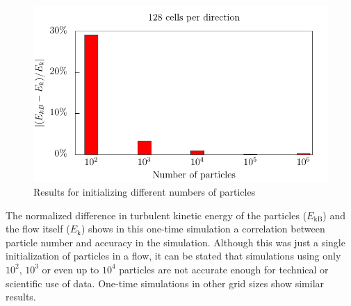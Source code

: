 \documentclass[11pt,a4paper,openany,oneside,parskip=half*]{article}
\begin{document}
\begin{figure}[h]
	\centering
  \includegraphics[width=\textwidth]{./../Simulationsergebnisse/variationPartikelAnzahl/128/kineticEnergy_numberOfParticles.pdf}
	\caption{Results for initializing different numbers of particles}
	\label{kineticEnergy_numberOfParticles}
\end{figure}
The normalized difference in turbulent kinetic energy of the particles ($E_\mathrm{kB}$) and the flow itself ($E_\mathrm{k}$) shows in this one-time simulation a correlation between particle number and accuracy in the simulation. Although this was just a single initialization of particles in a flow, it can be stated that simulations using only $10^2$, $10^3$ or even up to $10^4$ particles are not accurate enough for technical or scientific use of data. One-time simulations in other grid sizes show similar results.
\pagebreak
\end{document}
